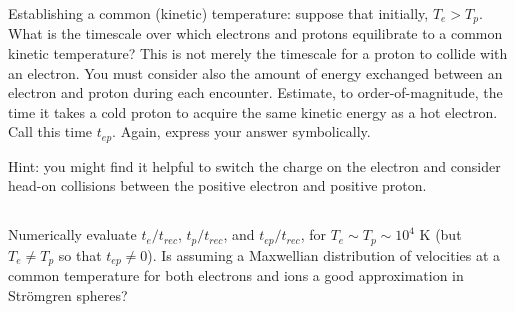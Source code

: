\documentclass[11pt]{article}
\def\Te{{T_e}}
\def\Tp{{T_p}}
\def\tep{{t_{ep}}}
\def\trec{{t_{rec}}}
\begin{document}
Establishing a common (kinetic) temperature: suppose that initially, $\Te>\Tp$.
What is the timescale over which electrons and protons equilibrate to a
common kinetic temperature? This is not merely the timescale for a proton to
collide with an electron. You must consider also the amount of energy exchanged
between an electron and proton during each encounter. Estimate, to
order-of-magnitude, the time it takes a cold proton to acquire the same kinetic
energy as a hot electron. Call this time $\tep$. Again, express your answer
symbolically.

Hint: you might find it helpful to switch the charge on the electron and
consider head-on collisions between the positive electron and positive proton.

\subsection{}\label{p3partd}

Numerically evaluate $t_e/\trec$, $t_p/\trec$, and $\tep/\trec$, for $\Te\sim\Tp\sim 10^4$ K
(but $\Te\ne\Tp$ so that $\tep\ne 0$). Is assuming a Maxwellian distribution of
velocities at a common temperature for both electrons and ions a good
approximation in Str\"omgren spheres?
\end{document}
